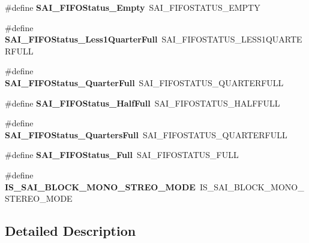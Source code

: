 \begin{DoxyCompactItemize}
\item 
\#define {\bfseries S\+A\+I\+\_\+\+F\+I\+F\+O\+Status\+\_\+\+Empty}~S\+A\+I\+\_\+\+F\+I\+F\+O\+S\+T\+A\+T\+U\+S\+\_\+\+E\+M\+P\+TY\hypertarget{group___h_a_l___s_a_i___aliased___macros_ga975ffaf2925f238e84e4ec58ff07507a}{}\label{group___h_a_l___s_a_i___aliased___macros_ga975ffaf2925f238e84e4ec58ff07507a}

\item 
\#define {\bfseries S\+A\+I\+\_\+\+F\+I\+F\+O\+Status\+\_\+\+Less1\+Quarter\+Full}~S\+A\+I\+\_\+\+F\+I\+F\+O\+S\+T\+A\+T\+U\+S\+\_\+\+L\+E\+S\+S1\+Q\+U\+A\+R\+T\+E\+R\+F\+U\+LL\hypertarget{group___h_a_l___s_a_i___aliased___macros_ga8bf03716c694dc3221b640dc5de670b6}{}\label{group___h_a_l___s_a_i___aliased___macros_ga8bf03716c694dc3221b640dc5de670b6}

\item 
\#define {\bfseries S\+A\+I\+\_\+\+F\+I\+F\+O\+Status\+\_\+Quarter\+Full}~S\+A\+I\+\_\+\+F\+I\+F\+O\+S\+T\+A\+T\+U\+S\+\_\+Q\+U\+A\+R\+T\+E\+R\+F\+U\+LL\hypertarget{group___h_a_l___s_a_i___aliased___macros_ga521399b510e0f29fc41fb516a27fe517}{}\label{group___h_a_l___s_a_i___aliased___macros_ga521399b510e0f29fc41fb516a27fe517}

\item 
\#define {\bfseries S\+A\+I\+\_\+\+F\+I\+F\+O\+Status\+\_\+\+Half\+Full}~S\+A\+I\+\_\+\+F\+I\+F\+O\+S\+T\+A\+T\+U\+S\+\_\+\+H\+A\+L\+F\+F\+U\+LL\hypertarget{group___h_a_l___s_a_i___aliased___macros_gafe9200ac26339d1334ab978ae508f352}{}\label{group___h_a_l___s_a_i___aliased___macros_gafe9200ac26339d1334ab978ae508f352}

\item 
\#define {\bfseries S\+A\+I\+\_\+\+F\+I\+F\+O\+Status\+\_\+Quarters\+Full}~S\+A\+I\+\_\+\+F\+I\+F\+O\+S\+T\+A\+T\+U\+S\+\_\+Q\+U\+A\+R\+T\+E\+R\+F\+U\+LL\hypertarget{group___h_a_l___s_a_i___aliased___macros_ga50b6fc16c49a0d4eb2575567f5e9be98}{}\label{group___h_a_l___s_a_i___aliased___macros_ga50b6fc16c49a0d4eb2575567f5e9be98}

\item 
\#define {\bfseries S\+A\+I\+\_\+\+F\+I\+F\+O\+Status\+\_\+\+Full}~S\+A\+I\+\_\+\+F\+I\+F\+O\+S\+T\+A\+T\+U\+S\+\_\+\+F\+U\+LL\hypertarget{group___h_a_l___s_a_i___aliased___macros_ga5e2fd1ac3cea38c8c2fe15cf70efe61a}{}\label{group___h_a_l___s_a_i___aliased___macros_ga5e2fd1ac3cea38c8c2fe15cf70efe61a}

\item 
\#define {\bfseries I\+S\+\_\+\+S\+A\+I\+\_\+\+B\+L\+O\+C\+K\+\_\+\+M\+O\+N\+O\+\_\+\+S\+T\+R\+E\+O\+\_\+\+M\+O\+DE}~I\+S\+\_\+\+S\+A\+I\+\_\+\+B\+L\+O\+C\+K\+\_\+\+M\+O\+N\+O\+\_\+\+S\+T\+E\+R\+E\+O\+\_\+\+M\+O\+DE\hypertarget{group___h_a_l___s_a_i___aliased___macros_gaa9eb7424d1a759fa3c84ee598b6d53a1}{}\label{group___h_a_l___s_a_i___aliased___macros_gaa9eb7424d1a759fa3c84ee598b6d53a1}

\end{DoxyCompactItemize}


\subsection{Detailed Description}
